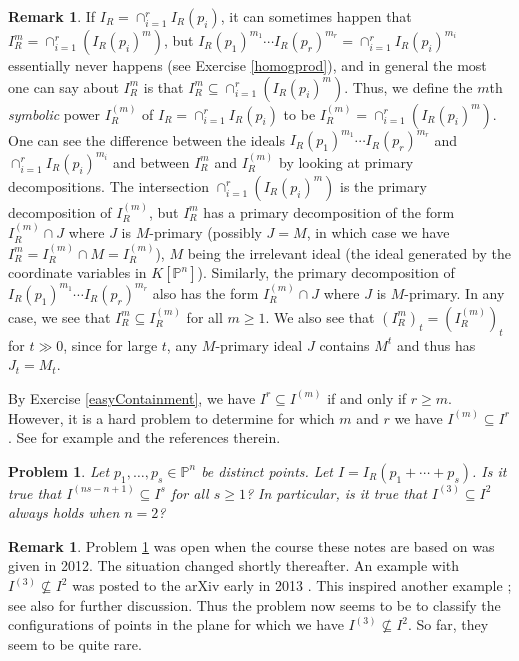 \documentclass[11pt,twoside]{amsart}
\numberwithin{equation}{section}
\newtheorem{problem}[theorem]{Problem}
\theoremstyle{definition}
\newtheorem{remark}[theorem]{Remark}
\begin{document}
\begin{remark}\label{sympowerRem}
If $I_R=\cap_{i=1}^rI_R(p_i)$, it can sometimes happen that 
$I_R^m=\cap_{i=1}^r(I_R(p_i)^m)$, but 
$I_R(p_1)^{m_1}\cdots I_R(p_r)^{m_r}= \cap_{i=1}^rI_R(p_i)^{m_i}$
essentially never happens (see Exercise \ref{homogprod}), and
in general the most one can say about $I^m_R$ is that
$I_R^m\subseteq \cap_{i=1}^r(I_R(p_i)^m)$.
Thus, we define the $m$th \emph{symbolic} power $I_R^{(m)}$ of $I_R=\cap_{i=1}^rI_R(p_i)$
to be $I_R^{(m)}=\cap_{i=1}^r(I_R(p_i)^m)$.
One can see the difference between the ideals
$I_R(p_1)^{m_1}\cdots I_R(p_r)^{m_r}$ and $\cap_{i=1}^rI_R(p_i)^{m_i}$
and between $I_R^m$ and $I_R^{(m)}$ by looking at primary decompositions.
The intersection $\cap_{i=1}^r(I_R(p_i)^m)$ is the primary decomposition
of $I_R^{(m)}$, but $I_R^m$ has a primary decomposition of the form
$I_R^{(m)}\cap J$ where $J$ is $M$-primary (possibly $J=M$, in which case
we have $I_R^m=I_R^{(m)}\cap M=I_R^{(m)}$), $M$ being the irrelevant ideal
(the ideal generated by the coordinate variables in ${K}[{\mathbb{P}^{n}}]$).
Similarly, the primary decomposition of
$I_R(p_1)^{m_1}\cdots I_R(p_r)^{m_r}$ also has the form 
$I_R^{(m)}\cap J$ where $J$ is $M$-primary.
In any case, we see that $I_R^m\subseteq I_R^{(m)}$ for all $m\geq 1$.
We also see that $(I_R^m)_t=(I_R^{(m)})_t$ for $t\gg0$,
since for large $t$, any $M$-primary ideal $J$ contains $M^t$ and thus has $J_t=M_t$.
\end{remark}

By Exercise \ref{easyContainment}, we have $I^r \subseteq I^{(m)}$ if and only if
$r\geq m$. However, it is a hard problem to determine for which $m$ 
and $r$ we have $I^{(m)}\subseteq I^r$.
See for example \cite{refELS,refHH,refCHT, refHaHu} and the references therein.

\begin{problem}\label{NotOpenProb}
Let $p_1,\ldots,p_s\in {\mathbb{P}^{n}}$ be distinct points. Let $I=I_R(p_1+\cdots+p_s)$.
Is it true that $I^{(ns-n+1)}\subseteq I^s$ for all $s\geq 1$?
In particular, is it true that $I^{(3)}\subseteq I^2$ always holds when $n=2$?
\end{problem}

\begin{remark}\label{notopenrem}
Problem \ref{NotOpenProb} was open when the course these notes are based on was given in
2012. The situation changed shortly thereafter. An example with $I^{(3)}\not\subseteq I^2$
was posted
to the arXiv early in 2013 \cite{refDST}. This inspired another example
\cite[Remark 3.11]{refBCH};
see also \cite{refHaSe} for further discussion. Thus the problem now seems to be to 
classify the configurations of points in the plane for which we have
$I^{(3)}\not\subseteq I^2$. So far, they seem to be quite rare.
\end{remark}
\end{document}
